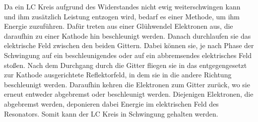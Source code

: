 Da ein LC Kreis aufgrund des Widerstandes nicht ewig weiterschwingen kann und ihm
zusätzlich Leistung entzogen wird, bedarf es einer Methode, um ihm Energie zuzuführen.
Dafür treten aus einer Glühwendel Elektronen aus, die daraufhin zu einer Kathode hin
beschleunigt werden. Danach durchlaufen sie das elektrische Feld zwischen den beiden
Gittern. Dabei können sie, je nach Phase der Schwingung auf ein beschleunigendes
oder auf ein abbremsendes elektrisches Feld stoßen. Nach dem Durchgang durch die Gitter fliegen sie in das entgegengesetzt
zur Kathode ausgerichtete Reflektorfeld, in dem sie in die andere Richtung beschleunigt
werden. Daraufhin kehren die Elektronen zum Gitter zurück, wo sie erneut entweder
abgebremst oder beschleunigt werden. Diejenigen Elektronen, die abgebremst werden,
deponieren dabei Energie im elektrischen Feld des Resonators. Somit kann der LC Kreis
in Schwingung gehalten werden.
